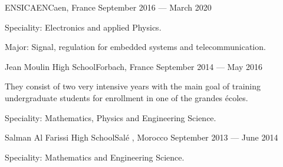 
    {ENSICAEN}{Caen, France}
    {September 2016 --- March 2020}
    {\begin{additems}
        \item Speciality: Electronics and applied Physics.
        \item Major: Signal, regulation for embedded systems and telecommunication.
    \end{additems}}

    {Jean Moulin High School}{Forbach, France}
    {September 2014 --- May 2016}
    {\begin{additems}
        \item They consist of two very intensive years with the main goal of training undergraduate students for enrollment in one of the 
            {grandes \'ecoles}.
        \item Speciality: Mathematics, Physics and Engineering Science.
    \end{additems}}

    {Salman Al Farissi High School}{Sal\'e , Morocco}
    {September 2013 --- June 2014}
    {\begin{additems}
        \item Speciality: Mathematics and Engineering Science.
    \end{additems}}

